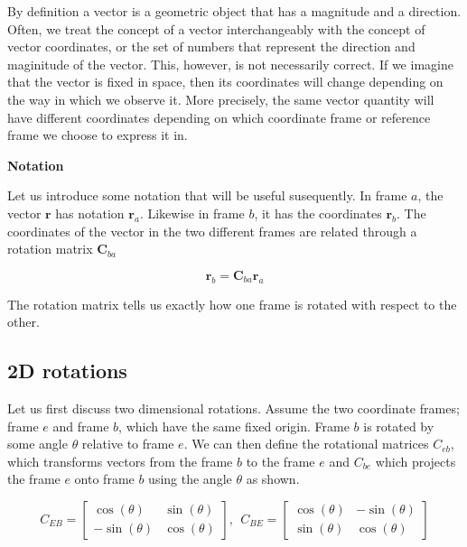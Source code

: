 By definition a vector  is a geometric object that has a magnitude and a direction.
Often, we treat the concept of a vector interchangeably with the concept
of vector coordinates, or the set of numbers that represent the direction and maginitude of the vector. This, however, is not necessarily correct. 
If we imagine that the vector is fixed in space, then its coordinates will change depending on the way in
which we observe it. More precisely, the same
vector quantity will have different coordinates depending on which coordinate
frame or reference frame we choose to express it in.

\begin{framed}
\theoremstyle{remark}
\begin{remark}{\textbf{Notation}}

Let us introduce some notation that will be useful susequently. 
In frame $a$, the vector $\mathbf{r}$ has notation $\mathbf{r}_a$. Likewise in frame $b$, it has the coordinates $\mathbf{r}_b$. 
The coordinates of the vector in the two different frames are related through a rotation matrix $\mathbf{C}_{ba}$

\begin{equation}
\mathbf{r}_b = \mathbf{C}_{ba}\mathbf{r}_a
\end{equation}

The rotation matrix tells us exactly how one frame is rotated with respect to the other.
\end{remark}
\end{framed} 


\subsection{2D rotations}

Let us first discuss two dimensional rotations. Assume the two coordinate frames; frame $e$ and frame $b$, which have the same fixed origin. 
Frame $b$ is rotated by some angle $\theta$ relative to frame $e$. We can then define the rotational matrices $C_{eb}$, which transforms vectors from the frame $b$ to the frame $e$ and $C_{be}$ which projects the frame $e$ onto frame $b$ using the angle $\theta$ as shown.

\begin{equation}
C_{EB} = 
\begin{bmatrix}
 \cos(\theta) & \sin(\theta) \\
 -\sin(\theta) & \cos(\theta) 
\end{bmatrix}, ~~
C_{BE} =
\begin{bmatrix}
 \cos(\theta) & -\sin(\theta) \\
 \sin(\theta) & \cos(\theta)
\end{bmatrix} 
\end{equation}

